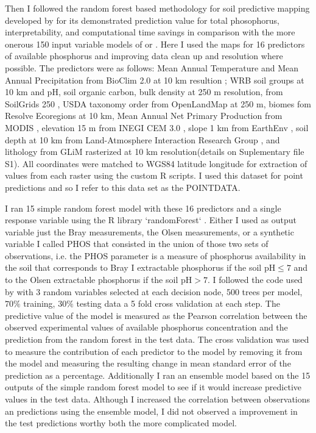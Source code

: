 Then I followed the random forest based methodology for soil predictive mapping developed by \citep{hexianjin2022} for its demonstrated prediction value for total phosophorus, interpretability, and computational time savings in comparison with the more onerous 150 input variable models of \citep{hengl2019} or \citep{mcdowell2023}. 
Here I used the maps for 16 predictors of available phosphorus and improving data clean up and resolution where possible.
The predictors were as follows: Mean Annual Temperature and Mean Annual Precipitation from BioClim 2.0 at 10 km resultion \citep{fick2017}; WRB soil groups at 10 km and pH, soil organic carbon, bulk density at 250 m resolution, from SoilGrids 250 \citep{hengl2019,hengl2017,wrb2022,scheffe2015}, USDA taxonomy order from OpenLandMap at 250 m, biomes fom Resolve Ecoregions \citep{dinerstein2017} at 10 km, Mean Annual Net Primary Production from MODIS \citep{running2015a}, elevation 15 m from INEGI CEM 3.0 \citep{inegi2019}, slope 1 km from EarthEnv \citep{amatulli2018}, soil depth at 10 km from Land-Atmosphere Interaction Research Group \citep{shangguan2017}, and lithology from GLiM rasterized at 10 km resolution\citep{hartmann2012}(details on Suplementary file S1).
All coordinates were matched to WGS84 latitude longitude for extraction of values from each raster using the custom R scripts.
I used this dataset for point predictions and so I refer to this data set as the POINTDATA.

I ran 15 simple random forest model with these 16 predictors and a single response variable using the R library `randomForest` \citep{liaw2002}. 
Either I used as output variable just the Bray measurements, the Olsen measurements, or a synthetic variable I called PHOS that consisted in the union of those two sets of observations, i.e. the PHOS parameter is a measure of phosphorus availability in the soil that corresponds to Bray I extractable phosphorus if the soil $\text{pH} \leq 7$ and to the Olsen extractable phosphorus if the soil $\text{pH} > 7$. 
I followed the code used by \citep{hexianjin2022}  with 3 random variables selected at each decision node, 500 trees per model, $70\%$ training, $30\%$ testing data a 5 fold cross validation at each step.
The predictive value of the model is measured as the Pearson correlation between the observed experimental values of available phosphorus concentration and the prediction from the random forest in the test data. 
The cross validation was used to measure the contribution of each predictor to the model by removing it from the model and measuring the resulting change in mean standard error of the prediction as a percentage. 
Additionally I ran an ensemble model based on the 15 outputs of the simple random forest model to see if it would increase predictive values in the test data.
Although I increased the correlation between observations an predictions using the ensemble model, I did not observed a improvement in the test predictions worthy both the more complicated model.

